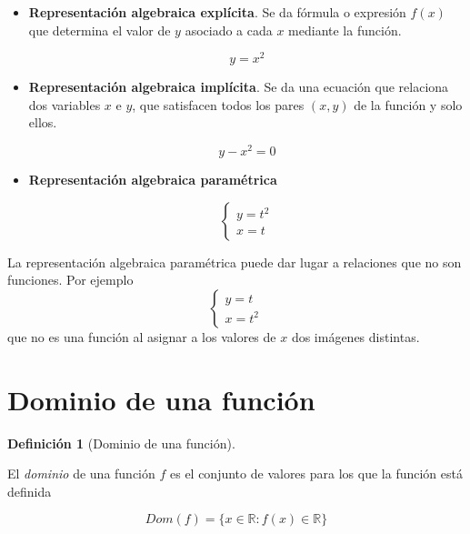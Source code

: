 \documentclass[
  a4paper,
]{scrreport}
\theoremstyle{definition}
\theoremstyle{plain}
\theoremstyle{definition}
\newtheorem{definition}{Definición}[chapter]
\theoremstyle{definition}
\theoremstyle{plain}
\theoremstyle{plain}
\theoremstyle{remark}
\begin{document}
\begin{itemize}
\item
  \textbf{Representación algebraica explícita}. Se da fórmula o
  expresión \(f(x)\) que determina el valor de \(y\) asociado a cada
  \(x\) mediante la función.

  \[y=x^2\]
\item
  \textbf{Representación algebraica implícita}. Se da una ecuación que
  relaciona dos variables \(x\) e \(y\), que satisfacen todos los pares
  \((x,y)\) de la función y solo ellos.

  \[y-x^2=0\]
\item
  \textbf{Representación algebraica paramétrica}

  \[\begin{cases}
    y=t^2\\
    x=t
    \end{cases}
    \]
\end{itemize}

\begin{tcolorbox}[enhanced jigsaw, leftrule=.75mm, colbacktitle=quarto-callout-caution-color!10!white, toprule=.15mm, opacityback=0, opacitybacktitle=0.6, toptitle=1mm, breakable, bottomtitle=1mm, colframe=quarto-callout-caution-color-frame, rightrule=.15mm, titlerule=0mm, title=\textcolor{quarto-callout-caution-color}{\faFire}\hspace{0.5em}{Precaución}, arc=.35mm, left=2mm, bottomrule=.15mm, colback=white, coltitle=black]

La representación algebraica paramétrica puede dar lugar a relaciones
que no son funciones. Por ejemplo \[\begin{cases}
  y=t\\
  x=t^2
  \end{cases}
  \] que no es una función al asignar a los valores de \(x\) dos
imágenes distintas.

\end{tcolorbox}

\section{Dominio de una función}\label{dominio-de-una-funciuxf3n}

\begin{definition}[Dominio de una
función]\protect\hypertarget{def-dominio-funcion}{}\label{def-dominio-funcion}

El \emph{dominio} de una función \(f\) es el conjunto de valores para
los que la función está definida

\[Dom(f)=\{x\in \mathbb{R}: f(x)\in \mathbb{R}\}\]

\end{definition}
\end{document}
